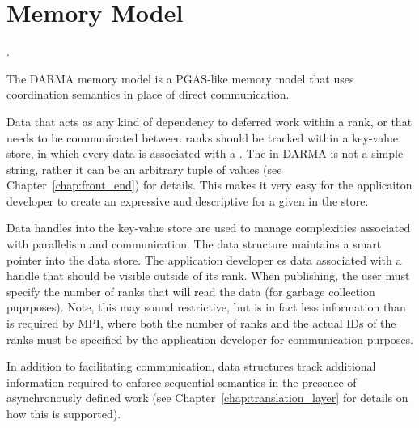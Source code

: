 \section{Memory Model}
\label{sec:mem_model}

.



The DARMA memory model is a \gls{PGAS}-like memory model that uses
\gls{coordination semantics} in place of direct communication.


Data that acts as any kind of dependency to deferred work within a rank, or
that needs to be communicated between ranks should be tracked within a
\gls{key-value store}, in which every data  is associated
with a .
The  in DARMA is not a simple
string, rather it can be an arbitrary \gls{tuple} of values (see Chapter~\ref{chap:front_end}) for details.
This makes it very easy for the applicaiton developer to create an expressive
and descriptive  for a given  in the store.


Data \glspl{handle} into the \gls{key-value store} are used to manage
complexities associated with parallelism and communication.  
The  data structure maintains a smart pointer into the data
store.  The application developer es data associated with a
handle that should be visible
outside of its \gls{rank}.  When publishing,  the user must specify the
number of \glspl{rank} that will read the data (for garbage
    collection puprposes).  Note, this may sound restrictive, but is in fact
less information than is required by \gls{MPI}, where both the number of ranks
and the actual IDs of the ranks must be specified by the application developer
for communication purposes.

In addition to facilitating communication,  data structures track additional information required 
to enforce \gls{sequential semantics} in the presence of asynchronously defined
work (see Chapter~\ref{chap:translation_layer} for details on how this is supported).


